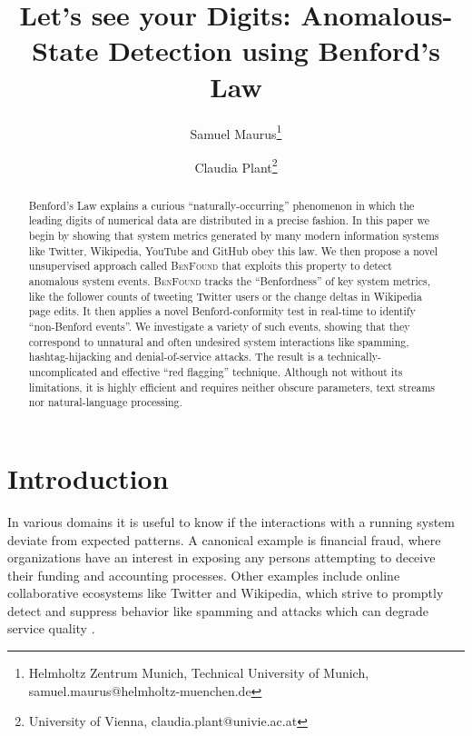 \documentclass[twoside,leqno,twocolumn]{article}\usepackage[]{graphicx}\usepackage[]{color}
\newcommand{\algoname}{\textsc{BenFound}}
\begin{document}

\title{Let's see your Digits: Anomalous-State Detection using Benford's Law}
\author{Samuel Maurus\thanks{Helmholtz Zentrum Munich, Technical University of Munich, samuel.maurus@helmholtz-muenchen.de} \\
  \and
  Claudia Plant\thanks{University of Vienna, claudia.plant@univie.ac.at}}
\date{}

\maketitle



\begin{abstract} \small\baselineskip=9pt Benford's Law explains a curious ``naturally-occurring'' phenomenon in which the leading digits of numerical data are distributed in a precise fashion. In this paper we begin by showing that system metrics generated by many modern information systems like Twitter, Wikipedia, YouTube and GitHub obey this law. We then propose a novel unsupervised approach called \algoname{} that exploits this property to detect anomalous system events. \algoname{} tracks the ``Benfordness'' of key system metrics, like the follower counts of tweeting Twitter users or the change deltas in Wikipedia page edits. It then applies a novel Benford-conformity test in real-time to identify ``non-Benford events''. We investigate a variety of such events, showing that they correspond to unnatural and often undesired system interactions like spamming, hashtag-hijacking and denial-of-service attacks. The result is a technically-uncomplicated and effective  ``red flagging'' technique. Although not without its limitations, it is highly efficient and requires neither obscure parameters, text streams nor natural-language processing.\end{abstract}

\section{Introduction}
\label{sec:introduction}

In various domains it is useful to know if the interactions with a running system deviate from expected patterns. A canonical example is financial fraud, where organizations have an interest in exposing any persons attempting to deceive their funding and accounting processes. Other examples include online collaborative ecosystems like Twitter and Wikipedia, which strive to promptly detect and suppress behavior like spamming and attacks which can degrade service quality \cite{twitterTos}.
\end{document}
